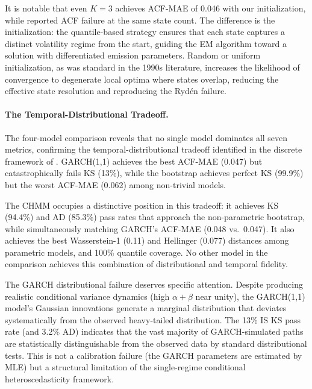 It is notable that even $K = 3$ achieves ACF-MAE of 0.046 with our initialization, while \citet{ryden1998stylized} reported ACF failure at the same state count.
The difference is the initialization: the quantile-based strategy ensures that each state captures a distinct volatility regime from the start, guiding the EM algorithm toward a solution with differentiated emission parameters.
Random or uniform initialization, as was standard in the 1990s literature, increases the likelihood of convergence to degenerate local optima where states overlap, reducing the effective state resolution and reproducing the Ryd\'{e}n failure.

\paragraph{The Temporal-Distributional Tradeoff.}
The four-model comparison reveals that no single model dominates all seven metrics, confirming the temporal-distributional tradeoff identified in the discrete framework of \citet{alswaidan2026hybrid}.
GARCH(1,1) achieves the best ACF-MAE (0.047) but catastrophically fails KS (13\%), while the bootstrap achieves perfect KS (99.9\%) but the worst ACF-MAE (0.062) among non-trivial models.

The CHMM occupies a distinctive position in this tradeoff: it achieves KS (94.4\%) and AD (85.3\%) pass rates that approach the non-parametric bootstrap, while simultaneously matching GARCH's ACF-MAE (0.048 vs.\ 0.047).
It also achieves the best Wasserstein-1 (0.11) and Hellinger (0.077) distances among parametric models, and 100\% quantile coverage.
No other model in the comparison achieves this combination of distributional and temporal fidelity.

The GARCH distributional failure deserves specific attention.
Despite producing realistic conditional variance dynamics (high $\alpha + \beta$ near unity), the GARCH(1,1) model's Gaussian innovations generate a marginal distribution that deviates systematically from the observed heavy-tailed distribution.
The 13\% IS KS pass rate (and 3.2\% AD) indicates that the vast majority of GARCH-simulated paths are statistically distinguishable from the observed data by standard distributional tests.
This is not a calibration failure (the GARCH parameters are estimated by MLE) but a structural limitation of the single-regime conditional heteroscedasticity framework.

